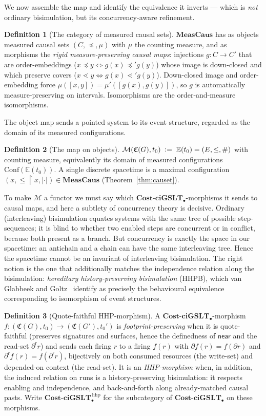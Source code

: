 \documentclass[11pt]{article}
\theoremstyle{definition}
\newtheorem{definition}{Definition}[section]
\theoremstyle{plain}
\newcommand{\ciGSLT}{\mathbf{ciGSLT}}
\newcommand{\CostCp}{\mathbf{Cost}\text{-}\ciGSLT_{\bullet}}
\newcommand{\Cost}{\mathfrak{C}}
\newcommand{\near}{\mathsf{near}}
\newcommand{\foot}{\partial}                       %
\newcommand{\rfoot}{\partial^{\mathsf r}}          %
\newcommand{\Conf}{\mathrm{Conf}}
\newcommand{\Ev}{\mathbb{E}}
\newcommand{\Evt}{E}
\newcommand{\lc}{\lessdot}                          %
\newcommand{\MeasCaus}{\mathbf{MeasCaus}}
\newcommand{\Map}{\mathcal{M}}
\newcommand{\confl}{\mathrel{\#}}                  %
\newcommand{\meas}{\mu}
\newcommand{\restrict}{\!\restriction\!}
\newcommand{\defeq}{\;\mathrel{\vcentcolon=}\;}
\theoremstyle{remark}
\begin{document}
We now assemble the map and identify the equivalence it inverts ---
which is \emph{not} ordinary bisimulation, but its concurrency-aware
refinement.

\begin{definition}[The category of measured causal sets]
\label{def:meascaus}
$\MeasCaus$ has as objects measured causal sets $(C,\preceq,\meas)$ with
$\meas$ the counting measure, and as morphisms the \emph{rigid
measure-preserving causal maps}: injections $g : C \to C'$ that are
order-embeddings ($x \preceq y \iff g(x) \preceq' g(y)$) whose image is
down-closed and which preserve covers ($x \lc y \iff g(x) \lc' g(y)$).
Down-closed image and order-embedding force $\meas([x,y]) =
\meas'([g(x),g(y)])$, so $g$ is automatically measure-preserving on
intervals. Isomorphisms are the order-and-measure isomorphisms.
\end{definition}

The object map sends a pointed system to its event structure, regarded
as the domain of its measured configurations.

\begin{definition}[The map on objects]
\label{def:objmap}
$\Map(\Cost(G), t_0) \defeq \Ev(t_0) = (\Evt, \le, \confl)$ with counting
measure, equivalently its domain of measured configurations
$\Conf(\Ev(t_0))$. A single discrete spacetime is a maximal
configuration $(x, \le\restrict x, |\cdot|) \in \MeasCaus$
(Theorem~\ref{thm:causet}).
\end{definition}

To make $\Map$ a functor we must say which $\CostCp$-morphisms it sends
to causal maps, and here a subtlety of concurrency theory is decisive.
Ordinary (interleaving) bisimulation equates systems with the same tree
of possible step-sequences; it is blind to whether two enabled steps are
concurrent or in conflict, because both present as a branch. But
concurrency is exactly the space in our spacetime: an antichain and a
chain can have the same interleaving tree. Hence the spacetime cannot be
an invariant of interleaving bisimulation. The right notion is the one
that additionally matches the independence relation along the
bisimulation: \emph{hereditary history-preserving bisimulation} (HHPB),
which van Glabbeek and Goltz~\cite{vGG} identify as precisely the
behavioural equivalence corresponding to isomorphism of event
structures.

\begin{definition}[Quote-faithful HHP-morphism]
\label{def:hhpb}
A $\CostCp$-morphism $f : (\Cost(G), t_0) \to (\Cost(G'), t_0')$ is
\emph{footprint-preserving} when it is quote-faithful (preserves
signatures and surfaces, hence the definedness of $\near$ and the
read-set $\rfoot r$) and sends each firing $r$ to a firing $f(r)$ with
$\foot{f(r)} = f(\foot r)$ and $\rfoot{f(r)} = f(\rfoot r)$,
bijectively on both consumed resources (the write-set) and depended-on
context (the read-set). It is an \emph{HHP-morphism} when, in addition,
the induced relation on runs is a history-preserving bisimulation: it
respects enabling and independence, and back-and-forth along
already-matched causal pasts. Write $\CostCp^{\,\mathrm{hhp}}$ for the
subcategory of $\CostCp$ on these morphisms.
\end{definition}
\end{document}

